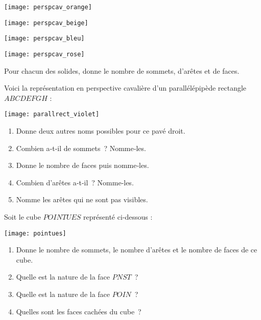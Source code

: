 

\begin{exercice}
\begin{colenumerate}{2}
 \item
 
 \texttt{[image: perspcav\_orange]}
 \item
 
 \texttt{[image: perspcav\_beige]}
 \item
 
 \texttt{[image: perspcav\_bleu]}
 \item
 
 \texttt{[image: perspcav\_rose]}

 \end{colenumerate}
Pour chacun des solides, donne le nombre de sommets, d'arêtes et de faces. 
\end{exercice}


\begin{exercice} \label{VolSol_entrain2}
Voici la représentation en perspective cavalière d'un parallélépipède rectangle $ABCDEFGH$ :
\begin{center} \texttt{[image: parallrect\_violet]} \end{center}
\begin{enumerate}
 \item Donne deux autres noms possibles pour ce pavé droit.
 \item Combien a‑t‑il de sommets ? Nomme‑les.
 \item Donne le nombre de faces puis nomme‑les.
 \item Combien d'arêtes a‑t‑il ? Nomme‑les.
 \item Nomme les arêtes qui ne sont pas visibles.
 \end{enumerate}
\end{exercice}


\begin{exercice} \label{VolSol_entrain1}
Soit le cube $POINTUES$ représenté ci‑dessous :
\begin{center} \texttt{[image: pointues]} \end{center}
\begin{enumerate}
 \item Donne le nombre de sommets, le nombre d'arêtes et le nombre de faces de ce cube.
 \item Quelle est la nature de la face $PNST$ ?
 \item Quelle est la nature de la face $POIN$ ?
 \item Quelles sont les faces cachées du cube ?
 \end{enumerate}
\end{exercice}


